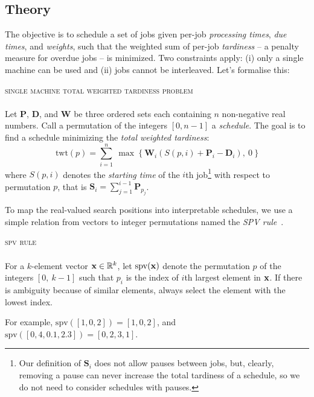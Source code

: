 \documentclass[a4paper,final,9pt]{article}
\begin{document}
\subsection{Theory}
The objective is to schedule a set of jobs given per-job
\emph{processing times}, \emph{due times}, and \emph{weights}, such that the
weighted sum of per-job \emph{tardiness} -- a penalty measure for overdue jobs
-- is minimized. Two constraints apply: (i) only a single machine can be used
and (ii) jobs cannot be interleaved. Let's formalise this:

\begin{framed}
  \textsc{single machine total weighted tardiness problem}
\\
\ \\
Let $\textbf{P}$, $\textbf{D}$, and $\textbf{W}$ be three ordered sets each
containing $n$ non-negative real numbers. Call a permutation of the integers
$[0, n-1]$ a \emph{schedule}.  The goal is to find a schedule minimizing the
\emph{total weighted tardiness}:
$$
\text{twt}(p) = \sum_{i=1}^{n}~\max~\{~\textbf{W}_i(S(p, i) + 
                  \textbf{P}_i - \textbf{D}_i),~0~\} 
$$
where $S(p, i)$ denotes the \emph{starting time} of the $i$th job\footnote{Our
definition of $\textbf{S}_i$ does not allow pauses between jobs, but, clearly,
removing a pause can never increase the total tardiness of a schedule, so we
do not need to consider schedules with pauses.} with respect to permutation
$p$, that is $\textbf{S}_i = \sum_{j=1}^{i-1} \textbf{P}_{p_j}$.
\end{framed}

To map the real-valued search positions into interpretable schedules, we use a
simple relation from vectors to integer permutations named the \emph{SPV
rule}~\cite{tardiness}.

\begin{framed}
\textsc{spv rule}
\\
\ \\
For a $k$-element vector $\mathbf{x} \in \mathbb{R}^k$, let $\text{spv}(\mathbf{x})$
denote the permutation $p$ of the integers $[0,~k-1]$ such that $p_i$ is the
index of $i$th largest element in $\mathbf{x}$. If there is ambiguity because of
similar elements, always select the element with the lowest index.
\end{framed}
\noindent
For example, $\text{spv}([1,0,2]) = [1,0,2]$, and $\text{spv}([0,4,0.1,2.3])
= [0,2,3,1]$.
\end{document}
